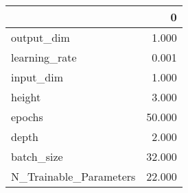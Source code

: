 \begin{tabular}{lr}
\toprule
{} &       0 \\
\midrule
output\_dim             &   1.000 \\
learning\_rate          &   0.001 \\
input\_dim              &   1.000 \\
height                 &   3.000 \\
epochs                 &  50.000 \\
depth                  &   2.000 \\
batch\_size             &  32.000 \\
N\_Trainable\_Parameters &  22.000 \\
\bottomrule
\end{tabular}
